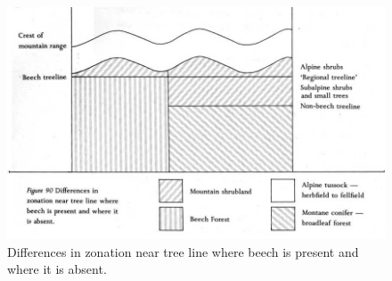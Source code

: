 \begin{figure}[t]
	\begin{minipage}[t]{\textwidth}
		\begin{minipage}[t]{(\textwidth-\fgap) * \real{0.71}}
			\centering
			\includegraphics[width=\textwidth]{graphics/figure90zonation.jpg}
			\caption[Differences in zonation]{Differences in zonation near tree line where beech is present and where it is absent.}%
			\label{fig:90zonation}
		\end{minipage}\hspace{\fgap}%
		\begin{minipage}[t]{(\textwidth-\fgap) * \real{0.29}}
			\centering

\end{minipage}
\end{minipage}
\end{figure}
